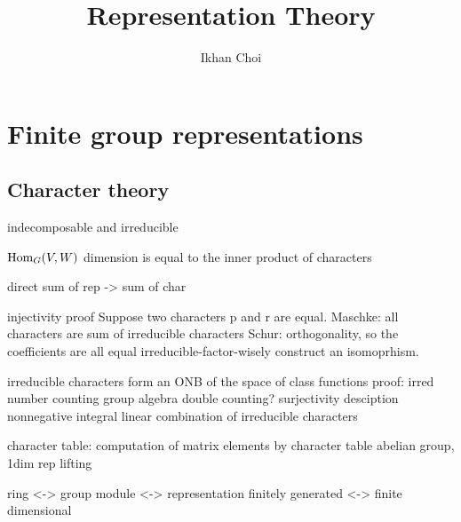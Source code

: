 \documentclass{../note}
\begin{document}
\title{Representation Theory}
\author{Ikhan Choi}
\maketitle
\tableofcontents

\part{Finite group representations}
\chapter{Character theory}
\begin{prb}
\end{prb}

\begin{prb}
\end{prb}

\begin{prb}
indecomposable and irreducible
\end{prb}

\begin{prb}
\end{prb}






\begin{prb}
$\operatorname{Hom}_G(V,W)$
dimension is equal to the inner product of characters
\end{prb}



direct sum of rep -> sum of char

injectivity proof
	Suppose two characters p and r are equal.
	Maschke: all characters are sum of irreducible characters
	Schur: orthogonality, so the coefficients are all equal
	irreducible-factor-wisely construct an isomoprhism.

irreducible characters form an ONB of the space of class functions
	proof: irred number counting
	group algebra double counting?
surjectivity desciption
	nonnegative integral linear combination of irreducible characters

character table: %
computation of matrix elements by character table
abelian group, 1dim rep lifting


\begin{prb}
ring <-> group
module <-> representation
finitely generated <-> finite dimensional
\end{prb}
\end{document}
